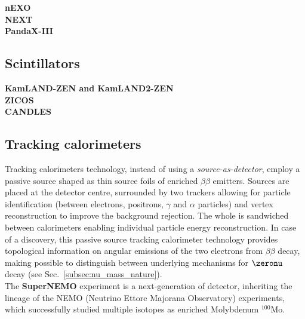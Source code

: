 \textbf{nEXO}\\
\textbf{NEXT}\\
\textbf{PandaX-III}
\subsection{Scintillators}
\label{subsec:scintillators}
\textbf{KamLAND-ZEN and KamLAND2-ZEN}\\
\textbf{ZICOS}\\
\textbf{CANDLES}
\subsection{Tracking calorimeters}
\label{subsec:trackocalo}
Tracking calorimeters technology, instead of using a \emph{source-as-detector}, employ a passive source shaped as thin source foils of enriched $\beta\beta$ emitters.
Sources are placed at the detector centre, surrounded by two trackers allowing for particle identification (between electrons, positrons, $\gamma$ and $\alpha$ particles) and vertex reconstruction to improve the background rejection.
The whole is sandwiched between calorimeters enabling individual particle energy reconstruction.
In case of a discovery, this passive source tracking calorimeter technology provides topological information on angular emissions of the two electrons from $\beta\beta$ decay, making possible to distinguish between underlying mechanisms for $\zeronu$ decay (see Sec.~\ref{subsec:nu_mass_nature}).\\

The \textbf{SuperNEMO} experiment is a next-generation of detector, inheriting the lineage of the NEMO (Neutrino Ettore Majorana Observatory) experiments, which successfully studied multiple isotopes as enriched Molybdenum $^{100}$Mo.
